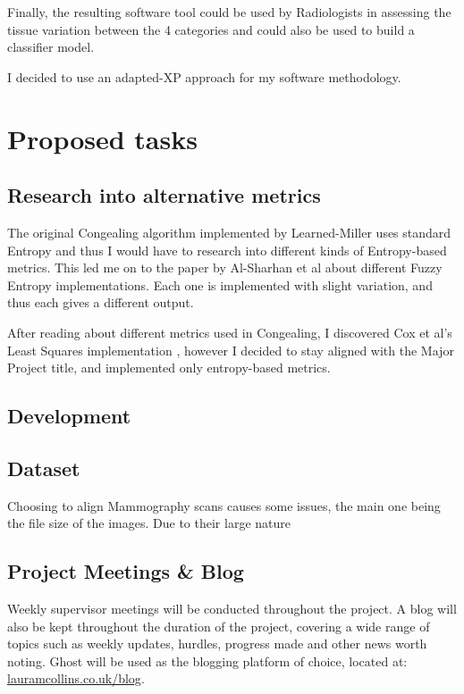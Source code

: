 \documentclass[11pt,fleqn,twoside]{article}
\begin{document}
Finally, the resulting software tool could be used by Radiologists in assessing the tissue variation between the 4 categories and could also be used to build a classifier model.

I decided to use an adapted-XP approach for my software methodology.

\section{Proposed tasks}

\subsection{Research into alternative metrics}
\label{ssec:alt-met}
The original Congealing algorithm implemented by Learned-Miller uses standard Entropy and thus I would have to research into different kinds of Entropy-based metrics. This led me on to the paper by Al-Sharhan et al \cite{fuzzy-entropy} about different Fuzzy Entropy implementations. Each one is implemented with slight variation, and thus each gives a different output.

After reading about different metrics used in Congealing, I discovered Cox et al's Least Squares implementation \cite{least-squares-congealing}, however I decided to stay aligned with the Major Project title, and implemented only entropy-based metrics.

\subsection{Development}

\subsection{Dataset}
Choosing to align Mammography scans causes some issues, the main one being the file size of the images. Due to their large nature

\subsection{Project Meetings \& Blog}
Weekly supervisor meetings will be conducted throughout the project. A blog will also be kept throughout the duration of the project, covering a wide range of topics such as weekly updates, hurdles, progress made and other news worth noting. Ghost will be used as the blogging platform of choice, located at: \url{lauramcollins.co.uk/blog}.
\end{document}
